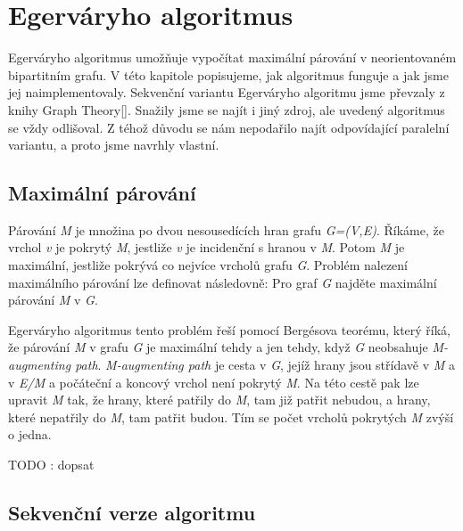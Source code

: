 \documentclass[a4paper, 12pt, titlepage, final]{article}[3. prosinec 2011]
\begin{document}
\section{Egerváryho algoritmus}

Egerváryho algoritmus umožňuje vypočítat maximální párování v neorientovaném bipartitním grafu. V této kapitole popisujeme, jak algoritmus funguje a jak jsme jej naimplementovaly. Sekvenční variantu Egerváryho algoritmu jsme převzaly z knihy Graph Theory[\cite{Bondy:2008}]. Snažily jsme se najít i jiný zdroj, ale uvedený algoritmus se vždy odlišoval. Z téhož důvodu se nám nepodařilo najít odpovídající paralelní variantu, a proto jsme navrhly vlastní.

\subsection{Maximální párování}

Párování \textit{M} je množina po dvou nesousedících hran grafu \textit{G=(V,E)}. Říkáme, že vrchol \textit{v} je pokrytý \textit{M}, jestliže \textit{v} je incidenční s hranou v \textit{M}. Potom \textit{M} je maximální, jestliže pokrývá co nejvíce vrcholů grafu \textit{G}. Problém nalezení maximálního párování lze definovat následovně: Pro graf \textit{G} najděte maximální párování \textit{M} v \textit{G}. 

Egerváryho algoritmus tento problém řeší pomocí Bergésova teorému, který říká, že párování \textit{M} v grafu \textit{G} je maximální tehdy a jen tehdy, když \textit{G} neobsahuje \textit{M-augmenting path}. \textit{M-augmenting path} je cesta v \textit{G}, jejíž hrany jsou střídavě v \textit{M} a v \textit{E/M} a počáteční a koncový vrchol není pokrytý \textit{M}. Na této cestě pak lze upravit \textit{M} tak, že hrany, které patřily do \textit{M}, tam již patřit nebudou, a hrany, které nepatřily do \textit{M}, tam patřit budou. Tím se počet vrcholů pokrytých \textit{M} zvýší o jedna.


TODO : dopsat

\subsection{Sekvenční verze algoritmu}
\end{document}

